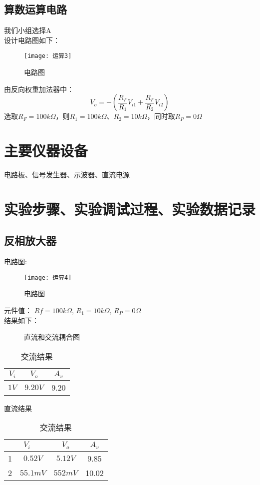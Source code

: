 \documentclass{../source/Experiment}
\begin{document}
        \subsection{算数运算电路}
        我们小组选择A\\
        设计电路图如下：
            \begin{figure}[h]
                \centering
                \texttt{[image: 运算3]}
                \caption{电路图}
            \end{figure}
        由反向权重加法器中：
        $$V_o = -(\frac{R_F}{R_1}V_{i1}+\frac{R_F}{R_2}V_{i2})$$
        选取$R_F = 100k\Omega$，则$R_1 = 100k\Omega$、$R_2 = 10k\Omega$，同时取$R_P = 0\Omega$
    \section{主要仪器设备}
    电路板、信号发生器、示波器、直流电源
    \section{实验步骤、实验调试过程、实验数据记录}
        \subsection{反相放大器}
        电路图:
        \newpage
        \begin{figure}[h]
            \centering
            \texttt{[image: 运算4]}
            \caption{电路图}
        \end{figure}
        元件值：
        $Rf = 100k\Omega,\,R_1 = 10k\Omega,\,R_P = 0\Omega$\\
        结果如下：
        \begin{figure}[h]
            \centering
            \subfigure[1]{
                \texttt{[image: 运算6]}
            }
            \subfigure[2]{
            \texttt{[image: 运算7]}
            }
            \caption{直流和交流耦合图}
        \end{figure}
        \newpage
        \begin{table}[h]
            \centering
            \begin{tabular}{|c|c|c|}
            \hline
            $V_i$ & $V_o$   & $A_v$ \\ \hline
            $1V$  & $9.20V$ & 9.20  \\ \hline
            \end{tabular}
            \caption{直流结果}
            \begin{tabular}{|c|c|c|c|}
            \hline
            \multicolumn{2}{|c|}{$V_i$} & $V_o$   & $A_v$ \\ \hline
            1         & $0.52V$         & $5.12V$ & 9.85  \\ \hline
            2         & $55.1mV$        & $552mV$ & 10.02 \\ \hline
            \end{tabular}
            \caption{交流结果}
            \end{table}
\end{document}
